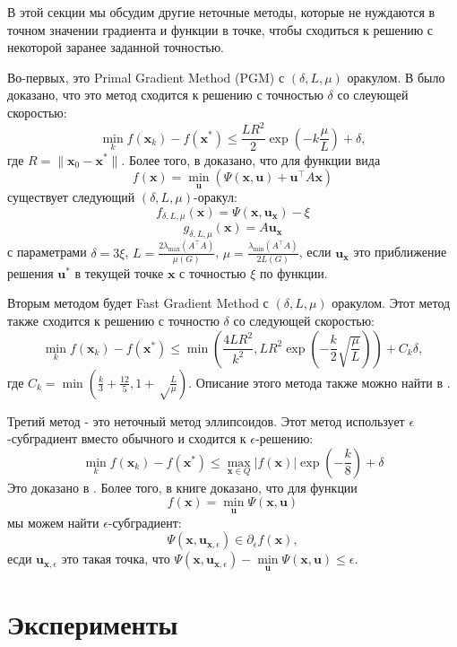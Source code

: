 \documentclass[12pt]{article}
\begin{document}
В этой секции мы обсудим другие неточные методы, которые не нуждаются в точном значении градиента и функции в точке, чтобы сходиться  к решению с некоторой заранее заданной точностью.

Во-первых, это Primal Gradient Method (PGM) с $(\delta, L,\mu)$ оракулом. В \cite{PGM} было доказано, что это метод сходится к решению с точностью $\delta$ со слеующей скоростью:
$$\min_k f(\textbf{x}_k) - f(\textbf{x}^*) \leq \frac{LR^2}{2}\exp\left(-k\frac{\mu}{L}\right) + \delta,$$
где $R = \|\textbf{x}_0-\textbf{x}^*\|$. Более того, в \cite{PGM} доказано, что для функции вида
$$f(\textbf{x}) = \min\limits_\textbf{u} \left(\Psi(\textbf{x},\textbf{u}) + \textbf{u}^\top A\textbf{x}\right)$$
существует следующий $(\delta, L,\mu)$-оракул:
$$f_{\delta, L,\mu}(\textbf{x}) = \Psi(\textbf{x}, \textbf{u}_\textbf{x}) - \xi$$
$$g_{\delta, L,\mu}(\textbf{x}) = A\textbf{u}_\textbf{x}$$
с параметрами $\delta = 3\xi$, $L = \frac{2\lambda_{\max}(A^\top A)}{\mu(G)}$, $\mu = \frac{\lambda_{\min}(A^\top A)}{2L(G)}$, если $\textbf{u}_\textbf{x}$ это приближение решения $\textbf{u}^*$ в текущей точке $\textbf{x}$ с точностью $\xi$ по функции.

Вторым методом будет Fast Gradient Method с $(\delta, L,\mu)$ оракулом. Этот метод также сходится к решению с точностю $\delta$ со следующей скоростью:
$$\min_k f(\textbf{x}_k) - f(\textbf{x}^*) \leq \min\left(\frac{4LR^2}{k^2}, LR^2\exp\left(-\frac{k}{2}\sqrt{\frac{\mu}{L}}\right)\right) + C_k\delta,$$
где $C_k = \min\left(\frac{k}{3}+\frac{12}{5}, 1+\sqrt\frac{L}{\mu}\right)$. Описание этого метода также можно найти в \cite{PGM}.


Третий метод - это неточный метод эллипсоидов. Этот метод использует $\epsilon$-субградиент вместо обычного и сходится к $\epsilon$-решению:
$$\min_k f(\textbf{x}_k) - f(\textbf{x}^*)\leq \max_{\textbf{x}\in Q}|f(\textbf{x})|\exp\left(-\frac{k}{8}\right)+\delta$$
Это доказано в \cite{Ellipsoids}. Более того, в книге \cite{Polyak} доказано, что для функции
$$f(\textbf{x}) = \min\limits_\textbf{u}\Psi(\textbf{x},\textbf{u})$$
мы можем найти $\epsilon$-субградиент:
$$\Psi(\textbf{x},\textbf{u}_{\textbf{x},\epsilon})\in\partial_\epsilon f(\textbf{x}),$$
есди $\textbf{u}_{\textbf{x},\epsilon}$ это такая точка, что $\Psi(\textbf{x},\textbf{u}_{\textbf{x},\epsilon}) - \min\limits_\textbf{u}\Psi(\textbf{x},\textbf{u})\leq\epsilon$.

\section{Эксперименты}
\label{Comparison}
\end{document}
